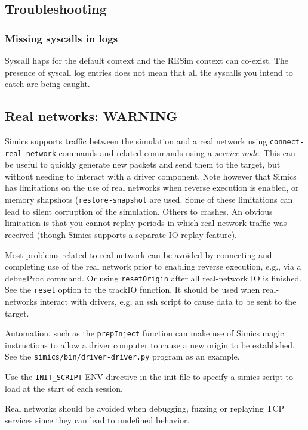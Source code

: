\documentclass[titlepage]{article}
\begin{document}
\begin{appendices}
\section{Troubleshooting}
\subsubsection{Missing syscalls in logs}
Syscall haps for the default context and the RESim context can co-exist.  The presence of syscall log entries does not
mean that all the syscalls you intend to catch are being caught.

\subsection{Real networks: WARNING}
\label{real-networks}
Simics supports traffic between the simulation and a real network using {\tt connect-real-network} commands and related commands using a \textit{service node}.
This can be useful to quickly generate new packets and send them to the target, but without needing to interact with a driver component.
Note however that Simics has limitations on the use of real networks when reverse execution is enabled, or memory shapshots ({\tt restore-snapshot} are used.  
Some of these limitations can lead to silent corruption
of the simulation.  Others to crashes.  An obvious limitation is that you cannot replay periods in which real network traffic was received (though Simics supports a separate IO replay feature).

Most problems related to real network can be avoided by connecting and completing use of the real network prior to enabling reverse execution, e.g., via a debugProc command.  Or using
{\tt resetOrigin} after all real-network IO is finished.  See the {\tt reset} option to the trackIO function.  It should be used when real-networks interact with drivers, e.g, an ssh
script to cause data to be sent to the target.

Automation, such as the {\tt prepInject} function can make use of Simics magic instructions to allow a driver computer to cause a new origin
to be established.  See the {\tt simics/bin/driver-driver.py} program as an example.

Use the {\tt INIT\_SCRIPT} ENV directive in the init file to specify a simics script to load at the start of each session.

Real networks should be avoided when debugging, fuzzing or replaying TCP services since they can lead to undefined behavior.


\end{appendices}
\end{document}
